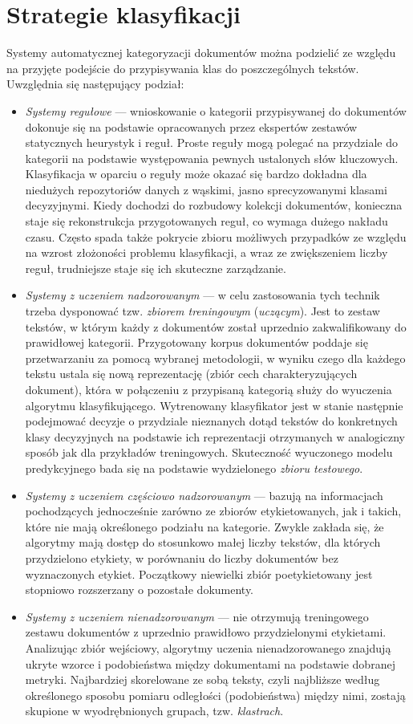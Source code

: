 \documentclass{pracamgr}
\begin{document}
\section{Strategie klasyfikacji}
Systemy automatycznej kategoryzacji dokumentów można podzielić ze względu na przyjęte podejście do przypisywania klas do poszczególnych tekstów. Uwzględnia się następujący podział:

\begin{itemize}
    \item \textit{Systemy regułowe} --- wnioskowanie o kategorii przypisywanej do dokumentów dokonuje się na podstawie opracowanych przez ekspertów zestawów statycznych heurystyk i reguł. Proste reguły mogą polegać na przydziale do kategorii na podstawie występowania pewnych ustalonych słów kluczowych. Klasyfikacja w oparciu o reguły może okazać się bardzo dokładna dla niedużych repozytoriów danych z wąskimi, jasno sprecyzowanymi klasami decyzyjnymi. Kiedy dochodzi do rozbudowy kolekcji dokumentów, konieczna staje się rekonstrukcja przygotowanych reguł, co wymaga dużego nakładu czasu. Często spada także pokrycie zbioru możliwych przypadków ze względu na wzrost złożoności problemu klasyfikacji, a wraz ze zwiększeniem liczby reguł, trudniejsze staje się ich skuteczne zarządzanie.
    \item \textit{Systemy z uczeniem nadzorowanym} --- w celu zastosowania tych technik trzeba dysponować tzw. \textit{zbiorem treningowym} (\textit{uczącym}). Jest to zestaw tekstów, w którym każdy z dokumentów został uprzednio zakwalifikowany do prawidłowej kategorii. Przygotowany korpus dokumentów poddaje się przetwarzaniu za pomocą wybranej metodologii, w wyniku czego dla każdego tekstu ustala się nową reprezentację (zbiór cech charakteryzujących dokument), która w połączeniu z przypisaną kategorią służy do wyuczenia algorytmu klasyfikującego. Wytrenowany klasyfikator jest w stanie następnie podejmować decyzje o przydziale nieznanych dotąd tekstów do konkretnych klasy decyzyjnych na podstawie ich reprezentacji otrzymanych w analogiczny sposób jak dla przykładów treningowych. Skuteczność wyuczonego modelu predykcyjnego bada się na podstawie wydzielonego \textit{zbioru testowego}.
    \item \textit{Systemy z uczeniem częściowo nadzorowanym} --- bazują na informacjach pochodzących jednocześnie zarówno ze zbiorów etykietowanych, jak i takich, które nie mają określonego podziału na kategorie. Zwykle zakłada się, że algorytmy mają dostęp do stosunkowo małej liczby tekstów, dla których przydzielono etykiety, w porównaniu do liczby dokumentów bez wyznaczonych etykiet. Początkowy niewielki zbiór poetykietowany jest stopniowo rozszerzany o pozostałe dokumenty.
    \item \textit{Systemy z uczeniem nienadzorowanym} --- nie otrzymują treningowego zestawu dokumentów z uprzednio prawidłowo przydzielonymi etykietami. Analizując zbiór wejściowy, algorytmy uczenia nienadzorowanego znajdują ukryte wzorce i podobieństwa między dokumentami na podstawie dobranej metryki. Najbardziej skorelowane ze sobą teksty, czyli najbliższe według określonego sposobu pomiaru odległości (podobieństwa) między nimi, zostają skupione w wyodrębnionych grupach, tzw. \textit{klastrach}.
\end{itemize}
\end{document}
